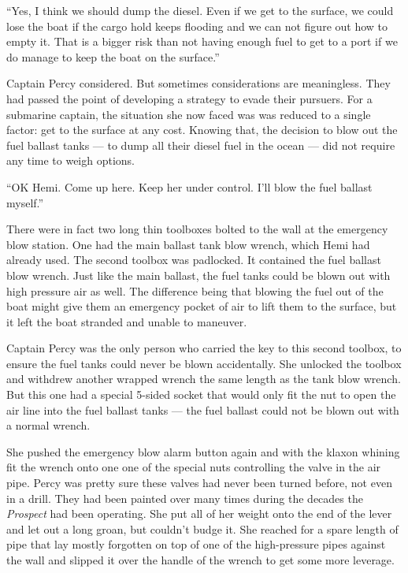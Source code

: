 \documentclass[
]{scrbook}
\begin{document}
``Yes, I think we should dump the diesel. Even if we get to the surface,
we could lose the boat if the cargo hold keeps flooding and we can not
figure out how to empty it. That is a bigger risk than not having enough
fuel to get to a port if we do manage to keep the boat on the surface.''

Captain Percy considered. But sometimes considerations are meaningless.
They had passed the point of developing a strategy to evade their
pursuers. For a submarine captain, the situation she now faced was was
reduced to a single factor: get to the surface at any cost. Knowing
that, the decision to blow out the fuel ballast tanks --- to dump all
their diesel fuel in the ocean --- did not require any time to weigh
options.

``OK Hemi. Come up here. Keep her under control. I'll blow the fuel
ballast myself.''

There were in fact two long thin toolboxes bolted to the wall at the
emergency blow station. One had the main ballast tank blow wrench, which
Hemi had already used. The second toolbox was padlocked. It contained
the fuel ballast blow wrench. Just like the main ballast, the fuel tanks
could be blown out with high pressure air as well. The difference being
that blowing the fuel out of the boat might give them an emergency
pocket of air to lift them to the surface, but it left the boat stranded
and unable to maneuver.

Captain Percy was the only person who carried the key to this second
toolbox, to ensure the fuel tanks could never be blown accidentally. She
unlocked the toolbox and withdrew another wrapped wrench the same length
as the tank blow wrench. But this one had a special 5-sided socket that
would only fit the nut to open the air line into the fuel ballast tanks
--- the fuel ballast could not be blown out with a normal wrench.

She pushed the emergency blow alarm button again and with the klaxon
whining fit the wrench onto one one of the special nuts controlling the
valve in the air pipe. Percy was pretty sure these valves had never been
turned before, not even in a drill. They had been painted over many
times during the decades the \emph{Prospect} had been operating. She put
all of her weight onto the end of the lever and let out a long groan,
but couldn't budge it. She reached for a spare length of pipe that lay
mostly forgotten on top of one of the high-pressure pipes against the
wall and slipped it over the handle of the wrench to get some more
leverage.
\end{document}
